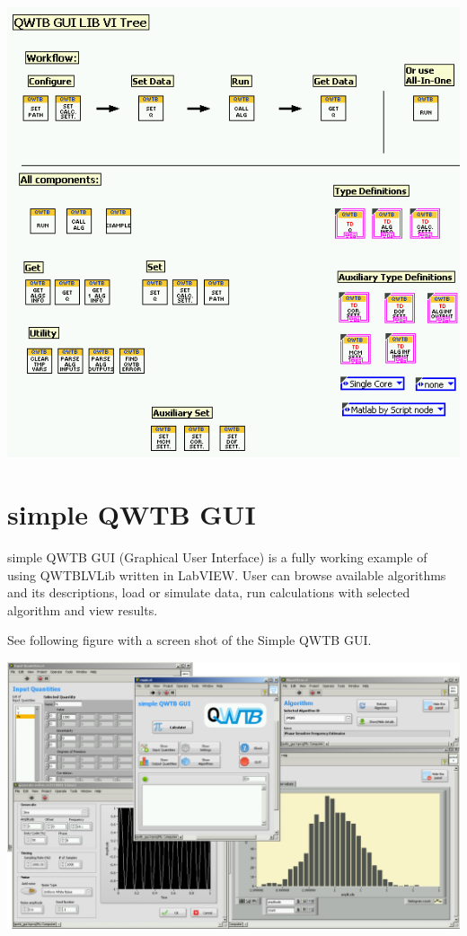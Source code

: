 \documentclass[12pt,a4paper,oneside]{report} %
\def\labview{{\sc LabVIEW}\xspace}
\begin{document}
\begin{center}
        \includegraphics[width=\textwidth]{sources/QWTBLVLib-vitree.png}
\end{center}

\section{simple QWTB GUI} %
simple QWTB GUI (Graphical User Interface) is a fully working example of using QWTBLVLib written in \labview.
User can browse available algorithms and its descriptions, load or simulate data, run calculations
with selected algorithm and view results.

See following figure with a screen shot of the Simple QWTB GUI.

\begin{center}
        \includegraphics[width=\textwidth]{sources/simpleQWTBGUI.png}
\end{center}
\end{document}
